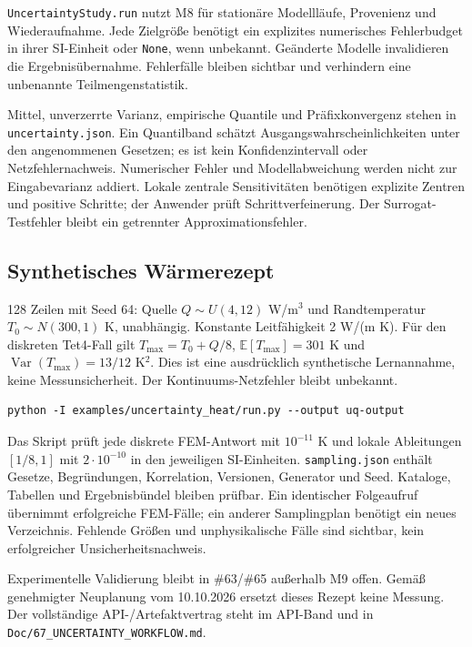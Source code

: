 \texttt{UncertaintyStudy.run} nutzt M8 für stationäre Modellläufe,
Provenienz und Wiederaufnahme. Jede Zielgröße benötigt ein explizites
numerisches Fehlerbudget in ihrer SI-Einheit oder \texttt{None}, wenn unbekannt.
Geänderte Modelle invalidieren die Ergebnisübernahme. Fehlerfälle bleiben
sichtbar und verhindern eine unbenannte Teilmengenstatistik.

Mittel, unverzerrte Varianz, empirische Quantile und Präfixkonvergenz stehen
in \texttt{uncertainty.json}. Ein Quantilband schätzt Ausgangswahrscheinlichkeiten
unter den angenommenen Gesetzen; es ist kein Konfidenzintervall oder
Netzfehlernachweis. Numerischer Fehler und Modellabweichung werden nicht
zur Eingabevarianz addiert. Lokale zentrale Sensitivitäten benötigen explizite
Zentren und positive Schritte; der Anwender prüft Schrittverfeinerung.
Der Surrogat-Testfehler bleibt ein getrennter Approximationsfehler.

\subsection{Synthetisches Wärmerezept}
\label{recipe:uncertainty-heat}
128 Zeilen mit Seed 64: Quelle $Q\sim U(4,12)$ W/m$^3$ und Randtemperatur
$T_0\sim N(300,1)$ K, unabhängig. Konstante Leitfähigkeit 2 W/(m K).
Für den diskreten Tet4-Fall gilt $T_{\max}=T_0+Q/8$,
$\mathbb E[T_{\max}]=301$ K und $\operatorname{Var}(T_{\max})=13/12$ K$^2$.
Dies ist eine ausdrücklich synthetische Lernannahme, keine Messunsicherheit.
Der Kontinuums-Netzfehler bleibt unbekannt.
\begin{lstlisting}
python -I examples/uncertainty_heat/run.py --output uq-output
\end{lstlisting}
Das Skript prüft jede diskrete FEM-Antwort mit $10^{-11}$ K und lokale
Ableitungen $[1/8,1]$ mit $2\cdot10^{-10}$ in den jeweiligen SI-Einheiten.
\texttt{sampling.json} enthält Gesetze, Begründungen, Korrelation, Versionen,
Generator und Seed. Kataloge, Tabellen und Ergebnisbündel bleiben prüfbar.
Ein identischer Folgeaufruf übernimmt erfolgreiche FEM-Fälle; ein anderer
Samplingplan benötigt ein neues Verzeichnis. Fehlende Größen und unphysikalische
Fälle sind sichtbar, kein erfolgreicher Unsicherheitsnachweis.



Experimentelle Validierung bleibt in \#63/\#65 außerhalb M9 offen.
Gemäß genehmigter Neuplanung vom 10.10.2026 ersetzt dieses Rezept keine Messung.
Der vollständige API-/Artefaktvertrag steht im API-Band und in
\nolinkurl{Doc/67_UNCERTAINTY_WORKFLOW.md}.
